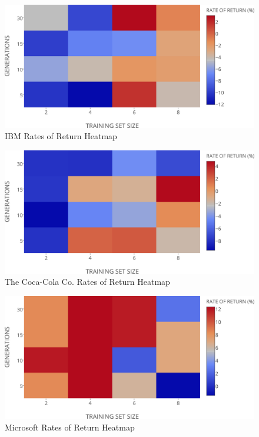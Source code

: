 \documentclass[12pt,journal,compsoc]{IEEEtran}
\begin{document}
\begin{figure}[h!]
\begin{center}
\includegraphics[width=1.00\columnwidth]{figures/rates-of-return-ibm-heatmap/rates-of-return-ibm-heatmap}
\caption{{\label{ibm-ror-heatmap}IBM Rates of Return Heatmap%
}}
\end{center}
\end{figure}

\begin{figure}[h!]
\begin{center}
\includegraphics[width=1.00\columnwidth]{figures/rates-of-return-ko-heatmap/rates-of-return-ko-heatmap}
\caption{{\label{ko-ror-heatmap}The Coca-Cola Co. Rates of Return Heatmap%
}}
\end{center}
\end{figure}

\begin{figure}[h!]
\begin{center}
\includegraphics[width=1.00\columnwidth]{figures/rates-of-return-msft-heatmap/rates-of-return-msft-heatmap}
\caption{{\label{msft-ror-heatmap}Microsoft Rates of Return Heatmap%
}}
\end{center}
\end{figure}
\end{document}
